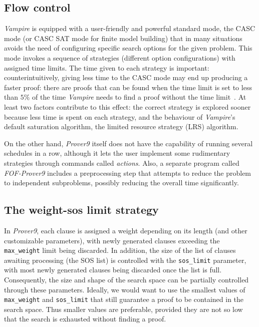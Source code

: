 \subsection{Flow control}\label{flow control}
\emph{Vampire} is equipped with a user-friendly and powerful standard mode, the CASC mode (or CASC SAT mode for finite model building) that in many situations avoids the need of configuring specific search options for the given problem. This mode invokes a sequence of strategies (different option configurations) with assigned time limits. The time given to each strategy is important: counterintuitively, giving less time to the CASC mode may end up producing a faster proof: there are proofs that can be found when the time limit is set to less than $5\%$ of the time \emph{Vampire} needs to find a proof without the time limit~\cite{DBLP:conf/cav/KovacsV13}. At least two factors contribute to this effect: the correct strategy is explored sooner because less time is spent on each strategy, and the behaviour of \emph{Vampire}'s default saturation algorithm, the limited resource strategy (LRS) algorithm.

On the other hand, \emph{Prover9} itself does not have the capability of running several schedules in a row, although it lets the user implement some rudimentary strategies through commands called \emph{actions}. Also, a separate program called \emph{FOF-Prover9} includes a preprocessing step that attempts to reduce the problem to independent subproblems, possibly reducing the overall time significantly.

\subsection{The weight-sos limit strategy}\label{weight_strategy}

In \emph{Prover9}, each clause is assigned a weight depending on its length (and other customizable parameters), with newly generated clauses exceeding the \verb|max_weight| limit being discarded. In addition, the size of the list of clauses awaiting processing (the SOS list) is controlled with the \verb|sos_limit| parameter, with most newly generated clauses being discarded once the list is full. Consequently, the size and shape of the search space can be partially controlled through these parameters. Ideally, we would want to use the smallest values of \verb|max_weight| and \verb|sos_limit| that still guarantee a proof to be contained in the search space. Thus smaller values are preferable, provided they are not so low that the search is exhausted without finding a proof.


